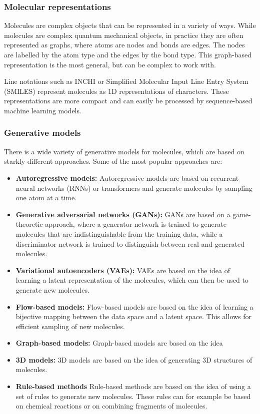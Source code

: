 \subsubsection{Molecular representations}
Molecules are complex objects that can be represented in a variety of ways.
While molecules are complex quantum mechanical objects, in practice they are
often represented as graphs, where atoms are nodes and bonds are edges. 
The nodes are labelled by the atom type and the edges by the bond type.
This graph-based representation is the most general, but can be complex 
to work with. 

Line notations such as INCHI \citep{todo} or Simplified Molecular Input Line
Entry System (SMILES) \citep{weiningerSMILESChemicalLanguage1988} 
represent molecules as 1D representations of characters. These representations are
more compact and can easily be processed by sequence-based machine learning models. 

\subsubsection{Generative models}
There is a wide variety of generative models for molecules, which are based 
on starkly different approaches. Some of the most popular approaches are:
\begin{itemize}
    \item \textbf{Autoregressive models:} Autoregressive models are based on
    recurrent neural networks (RNNs) or transformers \citep{vaswaniAttentionAllYou2017}
    and generate molecules by sampling one atom at a time. 
    \item \textbf{Generative adversarial networks (GANs):} GANs are based on a
    game-theoretic approach, where a generator network is trained to generate
    molecules that are indistinguishable from the training data, while a
    discriminator network is trained to distinguish between real and generated
    molecules.
    \item \textbf{Variational autoencoders (VAEs):} VAEs are based on the idea
    of learning a latent representation of the molecules, which can then be used
    to generate new molecules. 
    \item \textbf{Flow-based models:} Flow-based models are based on the idea of
    learning a bijective mapping between the data space and a latent space. This
    allows for efficient sampling of new molecules.
    \item \textbf{Graph-based models:} Graph-based models are based on the idea
    \item \textbf{3D models:} 3D models are based on the idea of generating 3D
    structures of molecules.
    \item{\textbf{Rule-based methods}} Rule-based methods are based on the idea
    of using a set of rules to generate new molecules. These rules can for example
    be based on chemical reactions or on combining fragments of molecules.
\end{itemize}
    


